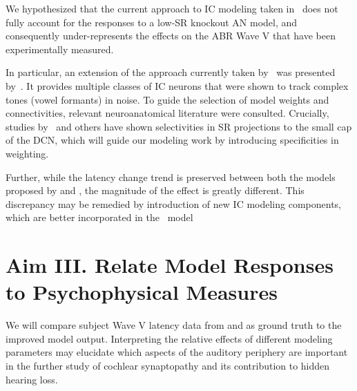 We hypothesized that the current approach to IC modeling taken in~\cite{Verhulst2015Functional,Mehraei2016Auditory} does not fully account for the responses to a low-SR knockout AN model, and consequently under-represents the effects on the ABR Wave V that have been experimentally measured.  

In particular, an extension of the approach currently taken by~\cite{Verhulst2015Functional} was presented by~\cite{Carney2015Speech}.  It provides multiple classes of IC neurons that were shown to track complex tones (vowel formants) in noise.  To guide the selection of model weights and connectivities, relevant neuroanatomical literature were consulted.  Crucially, studies by~\cite{Ryugo2008Projections} and others have shown selectivities in SR projections to the small cap of the DCN, which will guide  our modeling work by introducing specificities in weighting. 

Further, while the latency change trend is preserved between both the models proposed by \cite{Zilany2014Updated} and \cite{Verhulst2015Functional}, the magnitude of the effect is greatly different.  This discrepancy may be remedied by introduction of new IC modeling components, which are better incorporated in the~\cite{Zilany2014Updated} model

\section{Aim III. Relate Model Responses to Psychophysical Measures}  
We will compare subject Wave V latency data from \cite{Mehraei2015Auditory} and \cite{Mehraei2015Individual} as ground truth to the improved model output.  Interpreting the relative effects of different modeling parameters may elucidate which aspects of the auditory periphery are important in the further study of cochlear synaptopathy and its contribution to hidden hearing loss. 
